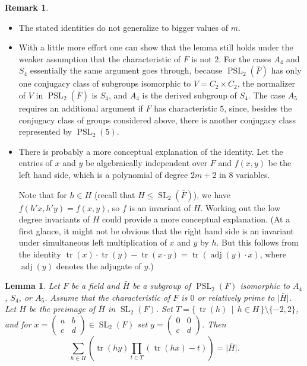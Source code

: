 \documentclass[12pt]{amsart}
\theoremstyle{plain}
\newtheorem{lemma}[theorem]{Lemma}
\theoremstyle{definition}
\newtheorem{remark}[theorem]{Remark}
\numberwithin{equation}{section}
\newcommand{\abs}[1]{\lvert#1\rvert}
\newcommand*{\set}[1]{\{#1\}}
\newcommand*{\defset}[2]{\{\,#1\,\mid\,#2\,\}}
\newcommand{\bH}{\bar{H}}
\DeclareMathOperator{\PSL}{PSL}
\DeclareMathOperator{\SL}{SL}
\DeclareMathOperator{\trace}{tr}
\DeclareMathOperator{\adj}{adj}
\begin{document}
\begin{remark}
  \begin{itemize}
    \item[(a)] The stated identities do not generalize to bigger
      values of $m$.
    \item[(b)] With a little more effort one can show that the lemma
      still holds under the weaker assumption that the characteristic
      of $F$ is not $2$. For the cases $A_4$ and $S_4$ essentially the
      same argument goes through, because $\PSL_2(\bar F)$ has only
      one conjugacy class of subgroups isomorphic to
      $V=C_2\times C_2$, the normalizer of $V$ in $\PSL_2(\bar F)$ is
      $S_4$, and $A_4$ is the derived subgroup of $S_4$. The case
      $A_5$ requires an additional argument if $F$ has characteristic
      $5$, since, besides the conjugacy class of groups considered
      above, there is another conjugacy class represented by
      $\PSL_2(5)$.
    \item[(c)] There is probably a more conceptual explanation of the
      identity. Let the entries of $x$ and $y$ be algebraically
      independent over $F$ and $f(x, y)$ be the left hand side, which
      is a polynomial of degree $2m+2$ in $8$ variables.
      
      Note that for $h\in H$ (recall that $H\le\SL_2(\bar F)$), we
      have $f(h'x, h'y)=f(x, y)$, so $f$ is an invariant of
      $H$. Working out the low degree invariants of $H$ could
      provide a more conceptual explanation. (At a first glance, it
      might not be obvious that the right hand side is an invariant
      under simultaneous left multiplication of $x$ and $y$ by
      $h$. But this follows from the identity
      $\trace(x)\cdot\trace(y)-\trace(x\cdot y)=\trace(\adj(y)\cdot
      x)$, where $\adj(y)$ denotes the adjugate of $y$.)
    \end{itemize}
\end{remark}
\begin{lemma}\label{l:polyhedral}
  Let $F$ be a field and $\bH$ be a subgroup of $\PSL_2(F)$ isomorphic
  to $A_4$, $S_4$, or $A_5$. Assume that the characteristic of $F$ is
  $0$ or relatively prime to $\abs{\bH}$. Let $H$ be the preimage of
  $\bH$ in $\SL_2(F)$. Set
  $T=\defset{\trace(h)}{h\in H}\setminus\set{-2, 2}$, and for
  $x = \begin{pmatrix}a & b\\c & d\end{pmatrix}\in\SL_2(F)$ set
  $y = \begin{pmatrix}0 & 0\\c & d\end{pmatrix}$. Then
  \[
    \sum_{h\in H}\left(\trace(hy)\prod_{t\in T}(\trace(hx)-t)\right)%
    =\abs{\bH}.
  \]
\end{lemma}
\end{document}

